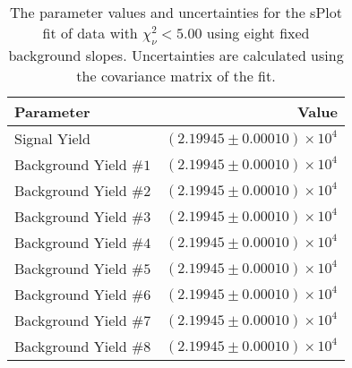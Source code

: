
\begin{table}[ht]
    \begin{center}
        \begin{tabular}{lr}\toprule
            Parameter & Value \\\midrule
            Signal Yield & $(2.19945 \pm 0.00010) \times 10^{4}$ \\
            Background Yield $\#1$ & $(2.19945 \pm 0.00010) \times 10^{4}$ \\
            Background Yield $\#2$ & $(2.19945 \pm 0.00010) \times 10^{4}$ \\
            Background Yield $\#3$ & $(2.19945 \pm 0.00010) \times 10^{4}$ \\
            Background Yield $\#4$ & $(2.19945 \pm 0.00010) \times 10^{4}$ \\
            Background Yield $\#5$ & $(2.19945 \pm 0.00010) \times 10^{4}$ \\
            Background Yield $\#6$ & $(2.19945 \pm 0.00010) \times 10^{4}$ \\
            Background Yield $\#7$ & $(2.19945 \pm 0.00010) \times 10^{4}$ \\
            Background Yield $\#8$ & $(2.19945 \pm 0.00010) \times 10^{4}$ \\\bottomrule
        \end{tabular}
        \caption{The parameter values and uncertainties for the sPlot fit of data with $\chi^2_\nu < 5.00$ using eight fixed background slopes. Uncertainties are calculated using the covariance matrix of the fit.}\label{tab:splot-fit-results-chisqdof-5.00-fixed-8}
    \end{center}
\end{table}
